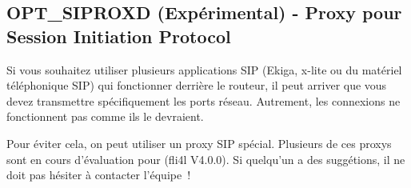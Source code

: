\subsection{OPT\_SIPROXD (Expérimental) - Proxy pour Session Initiation Protocol}

		Si vous souhaitez utiliser plusieurs applications SIP (Ekiga, x-lite
		ou du matériel téléphonique SIP) qui fonctionner derrière le routeur,
		il peut arriver que vous devez transmettre spécifiquement les ports réseau.
		Autrement, les connexions ne fonctionnent pas comme ils le devraient.

		Pour éviter cela, on peut utiliser un proxy SIP spécial. Plusieurs de ces
		proxys sont en cours d'évaluation pour (fli4l V4.0.0).
		Si quelqu'un a des suggétions, il ne doit pas hésiter à contacter l'équipe~!
